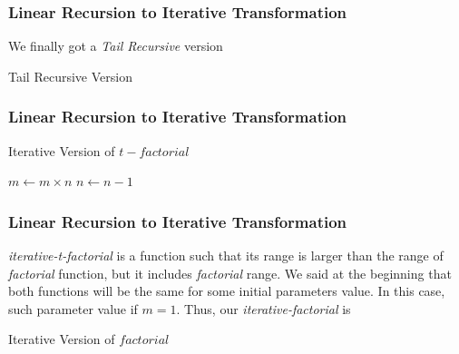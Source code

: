 \documentclass{beamer}
\begin{document}
\begin{frame}
	\frametitle{Linear Recursion to Iterative Transformation}
	We finally got a \textit{Tail Recursive} version
	\begin{block}{Tail Recursive Version} 
		\begin{algorithmic}[1]
				\State{}
			\Else
				\State{}
			\EndIf
			\EndProcedure
		\end{algorithmic}
	\end{block}
\end{frame}
\begin{frame}
	\frametitle{Linear Recursion to Iterative Transformation}
	\begin{block}{Iterative Version of $t-factorial$}
		\begin{algorithmic}[1]
				\State $m \gets m \times n$
				\State $n \gets n-1$
			\EndWhile
			\State{}
			\EndProcedure
		\end{algorithmic}
	\end{block}
\end{frame}
\begin{frame}
	\frametitle{Linear Recursion to Iterative Transformation}
	\textit{iterative-t-factorial} is a function such that its range is larger than the range of \textit{factorial} function, but it includes \textit{factorial} range. We said at the beginning that both functions will be the same for some initial parameters value. In this case, such parameter value if $m = 1$. Thus, our \textit{iterative-factorial} is
	\begin{block}{Iterative Version of $factorial$}
		\begin{algorithmic}[1]
			\State{}
			\EndProcedure
		\end{algorithmic}
	\end{block}
\end{frame}
\end{document}
